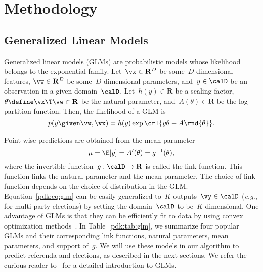 \section{Methodology}%
\label{pdk:sec:methodology}


\subsection{Generalized Linear Models}%
Generalized linear models (GLMs) are probabilistic models whose likelihood belongs to the exponential family.
Let~$\vx \in \mathbf{R}^D$ be some~$D$-dimensional features, $\vw \in \mathbf{R}^D$ be some~$D$-dimensional parameters, and~$y \in \calD$ be an observation in a given domain~$\calD$.
Let~$h(y) \in \mathbf{R}$ be a scaling factor, $\theta \define \vx\T \vw \in \mathbf{R}$ be the natural parameter, and~$A(\theta) \in \mathbf{R}$ be the log-partition function.
Then, the likelihood of a GLM is
\begin{equation}
	\label{pdk:eq:glm}
	p(y \given \vw, \vx) = h(y) \exp{\crl{y \theta - A \rnd{\theta}}}.
\end{equation}

Point-wise predictions are obtained from the mean parameter
\begin{equation*}
	\mu = \E[y] = A'(\theta) = g^{-1}(\theta),
\end{equation*}
where the invertible function~$g : \calD \rightarrow \mathbf{R}$ is called the link function.
This function links the natural parameter and the mean parameter.
The choice of link function depends on the choice of distribution in the GLM.
Equation~\eqref{pdk:eq:glm} can be easily generalized to~$K$ outputs~$\vy \in \calD$ (\textit{e.g.}, for multi-party elections) by setting the domain~$\calD$ to be~$K$-dimensional.
One advantage of GLMs is that they can be efficiently fit to data by using convex optimization methods~\cite{boyd2004convex}.
In Table~\ref{pdk:tab:glm}, we summarize four popular GLMs and their corresponding link functions, natural parameters, mean parameters, and support of~$g$.
We will use these models in our algorithm to predict referenda and elections, as described in the next sections.
We refer the curious reader to~\citet[Chapter~9]{murphy2012machine} for a detailed introduction to GLMs.

